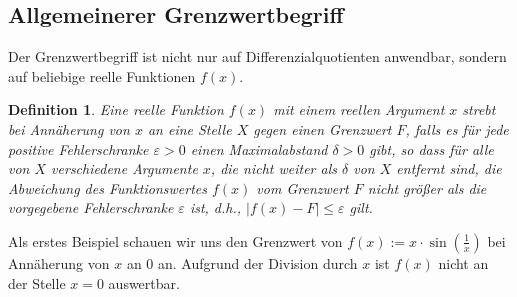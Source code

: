 \documentclass{article}
\let\l\left\let\r\right\let\cs\csname\let\ecs\endcsname\let\ea\expandafter
\newtheorem{Def}{Definition}
\begin{document}
\subsection{Allgemeinerer Grenzwertbegriff}

Der Grenzwertbegriff ist nicht nur auf Differenzialquotienten anwendbar, sondern auf beliebige reelle Funktionen $f(x)$.

\begin{Def}
  Eine reelle Funktion $f(x)$ mit einem reellen Argument $x$ strebt
  bei Annäherung von $x$ an eine Stelle $X$ gegen einen Grenzwert $F$,
  falls es für jede positive Fehlerschranke $\varepsilon>0$ einen
  Maximalabstand $\delta>0$ gibt, so dass für alle von $X$
  verschiedene Argumente $x$, die nicht weiter als $\delta$ von $X$
  entfernt sind, die Abweichung des Funktionswertes $f(x)$ vom
  Grenzwert $F$ nicht größer als die vorgegebene Fehlerschranke
  $\varepsilon$ ist, d.h., $|f(x)-F| \leq \varepsilon$ gilt.
\end{Def}
Als erstes Beispiel schauen wir uns den Grenzwert von
$f(x):=x\cdot \sin\l(\frac1x\r)$ bei Annäherung von $x$ an $0$
an. Aufgrund der Division durch $x$ ist $f(x)$ nicht an der Stelle
$x=0$ auswertbar.
\end{document}
